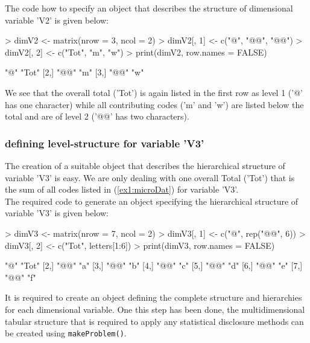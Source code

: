\documentclass{article}
\begin{document}
The code how to specify an object that describes the structure of dimensional 
variable 'V2' is given below:
\begin{Schunk}
\begin{Sinput}
> dimV2 <- matrix(nrow = 3, ncol = 2)
> dimV2[, 1] <- c("@", "@@", "@@")
> dimV2[, 2] <- c("Tot", "m", "w")
> print(dimV2, row.names = FALSE)
\end{Sinput}
\begin{Soutput}
     [,1] [,2] 
[1,] "@"  "Tot"
[2,] "@@" "m"  
[3,] "@@" "w"  
\end{Soutput}
\end{Schunk}

We see that the overall total ('Tot') is again listed in the first row as level 1
('@' has one character) while all contributing codes ('m' and 'w') are listed 
below the total and are of level 2 ('@@' has two characters).

\subsubsection*{defining level-structure for variable 'V3'}
The creation of a suitable object that describes the hierarchical structure
of variable 'V3' is easy. We are only dealing with one overall Total ('Tot')
that is the sum of all codes listed in (\ref{ex1:microDat}) for variable 'V3'.\\

The required code to generate an object specifying the hierarchical structure of 
variable 'V3' is given below:

\begin{Schunk}
\begin{Sinput}
> dimV3 <- matrix(nrow = 7, ncol = 2)
> dimV3[, 1] <- c("@", rep("@@", 6))
> dimV3[, 2] <- c("Tot", letters[1:6])
> print(dimV3, row.names = FALSE)
\end{Sinput}
\begin{Soutput}
     [,1] [,2] 
[1,] "@"  "Tot"
[2,] "@@" "a"  
[3,] "@@" "b"  
[4,] "@@" "c"  
[5,] "@@" "d"  
[6,] "@@" "e"  
[7,] "@@" "f"  
\end{Soutput}
\end{Schunk}

It is required to create an object defining the complete structure and 
hierarchies for each dimensional variable. One this step has been done, the 
multidimensional tabular structure that is required to apply any statistical 
disclosure methods can be created using {\tt makeProblem()}.
\end{document}

